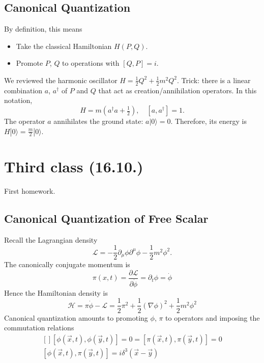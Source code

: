 \documentclass[12pt]{article}
\begin{document}
\subsection{Canonical Quantization}

By definition, this means 
\begin{itemize}
\item Take the classical Hamiltonian $H(P, Q)$.
\item Promote $P$, $Q$ to operations with $[Q, P] = i$.
\end{itemize}
We reviewed the harmonic oscillator $H=\frac{1}{2}Q^2 + \frac{1}{2}m^2
Q^2$. Trick: there is a linear combination $a$, $a^\dagger$ of $P$ and
$Q$ that act as creation/annihilation operators. In this notation,
\begin{equation}
  H= m(a^\dagger a + \tfrac{1}{2} )
  ,\quad
  [a, a^\dagger] = 1.
\end{equation}
The operator $a$ annihilates the ground state: $a|0\rangle =
0$. Therefore, its energy is $H|0\rangle = \frac{m}{2}|0\rangle$.


\section{Third class (16.10.)}

First homework.

\subsection{Canonical Quantization of Free Scalar}

Recall the Lagrangian density
\begin{equation}
  \mathcal{L} = -\frac{1}{2} 
  \partial_\mu \phi \partial^\mu \phi
  - \frac{1}{2} m^2 \phi^2.
\end{equation}
The canonically conjugate momentum is
\begin{equation}
  \pi(x,t) = \frac{\partial\mathcal{L}}{\partial \dot\phi} =
  \partial_t \phi = \dot\phi
\end{equation}
Hence the Hamiltonian density is 
\begin{equation}
  \mathcal{H} = \pi \dot\phi - \mathcal{L} = 
  \frac{1}{2}\pi^2 + 
  \frac{1}{2}(\nabla \phi)^2 +
  \frac{1}{2} m^2 \phi^2
\end{equation}
Canonical quantization amounts to promoting $\phi$, $\pi$ to operators
and imposing the commutation relations
\begin{equation}
  \begin{gathered}[]
    [\phi(\vec{x},t), \phi(\vec{y},t)] = 0 = 
    [\pi(\vec{x},t), \pi(\vec{y},t)] = 0
    \\
    [\phi(\vec{x}, t), \pi(\vec{y}, t)] = i \delta^3(\vec{x}-\vec{y})
  \end{gathered}
\end{equation}
\end{document}
